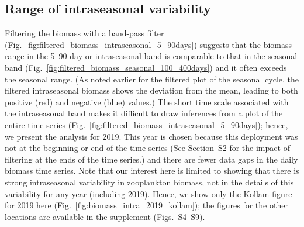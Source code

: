\documentclass[authoryear,review,11pt]{elsarticle}
\begin{document}

\subsection{Range of intraseasonal variability}
\label{sec:intraseasonal.range}

Filtering the biomass with a band-pass filter (Fig.~\ref{fig:filtered_biomass_intraseasonal_5_90days}) suggests that the biomass range in the 5--90-day or intraseasonal band is comparable to that in the seasonal band (Fig.~\ref{fig:filtered_biomass_seasonal_100_400days}) and it often exceeds the seasonal range. (As noted earlier for the filtered plot of the seasonal cycle, the filtered intraseasonal biomass shows the deviation from the mean, leading to both positive (red) and negative (blue) values.) The short time scale associated with the intraseasonal band makes it difficult to draw inferences from a plot of the entire time series (Fig.~\ref{fig:filtered_biomass_intraseasonal_5_90days}); hence, we present the analysis for 2019. This year is chosen because this deployment was not at the beginning or end of the time series (See Section~S2 for the impact of filtering at the ends of the time series.) and there are fewer data gaps in the daily biomass time series. Note that our interest here is limited to showing that there is strong intraseasonal variability in zooplankton biomass, not in the details of this variability for any year (including 2019).  Hence, we show only the Kollam figure for 2019 here (Fig.~\ref{fig:biomass_intra_2019_kollam}); the figures for the other locations are available in the supplement (Figs.~S4--S9).
\end{document}
